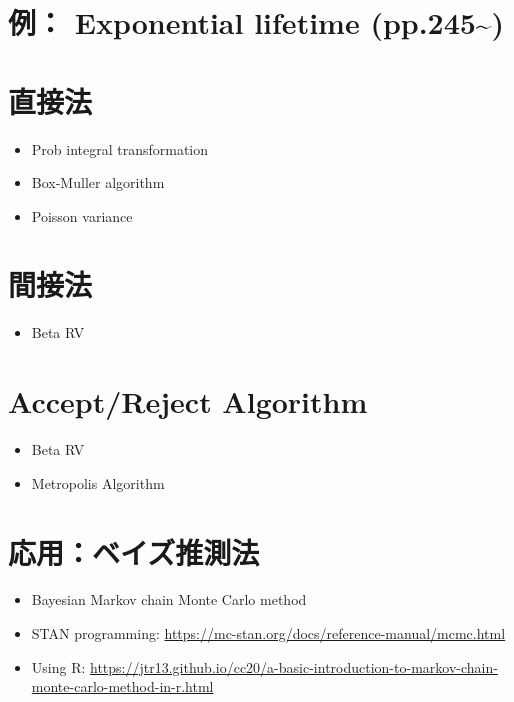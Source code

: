 \documentclass[
]{book}
\providecommand{\tightlist}{%
  \setlength{\itemsep}{0pt}\setlength{\parskip}{0pt}}
\begin{document}
\section{例： Exponential lifetime (pp.245\textasciitilde)}\label{ux4f8b-exponential-lifetime-pp.245}

\section{直接法}\label{ux76f4ux63a5ux6cd5}

\begin{itemize}
\tightlist
\item
  Prob integral transformation
\item
  Box-Muller algorithm
\item
  Poisson variance
\end{itemize}

\section{間接法}\label{ux9593ux63a5ux6cd5}

\begin{itemize}
\tightlist
\item
  Beta RV
\end{itemize}

\section{Accept/Reject Algorithm}\label{acceptreject-algorithm}

\begin{itemize}
\item
  Beta RV
\item
  Metropolis Algorithm
\end{itemize}

\section*{応用：ベイズ推測法}\label{ux5fdcux7528ux30d9ux30a4ux30baux63a8ux6e2cux6cd5}

\begin{itemize}
\tightlist
\item
  Bayesian Markov chain Monte Carlo method
\item
  STAN programming: \url{https://mc-stan.org/docs/reference-manual/mcmc.html}
\item
  Using R: \url{https://jtr13.github.io/cc20/a-basic-introduction-to-markov-chain-monte-carlo-method-in-r.html}
\end{itemize}
\end{document}

